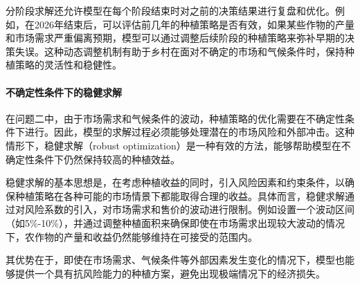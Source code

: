 \documentclass[12pt,a4paper]{nmmcm}
\begin{document}
分阶段求解还允许模型在每个阶段结束时对之前的决策结果进行复盘和优化。例如，在2026年结束后，可以评估前几年的种植策略是否有效，如果某些作物的产量和市场需求严重偏离预期，模型可以通过调整后续阶段的种植策略来弥补早期的决策失误。这种动态调整机制有助于乡村在面对不确定的市场和气候条件时，保持种植策略的灵活性和稳健性。

\paragraph{不确定性条件下的稳健求解}

在问题二中，由于市场需求和气候条件的波动，种植策略的优化需要在不确定性条件下进行。因此，模型的求解过程必须能够处理潜在的市场风险和外部冲击。这种情形下，稳健求解（robust optimization）是一种有效的方法，能够帮助模型在不确定性条件下仍然保持较高的种植效益。

稳健求解的基本思想是，在考虑种植收益的同时，引入风险因素和约束条件，以确保种植策略在各种可能的市场情景下都能取得合理的收益。具体而言，稳健求解通过对风险系数的引入，对市场需求和售价的波动进行限制。例如设置一个波动区间（如5\%-10\%），并通过调整种植面积来确保即使在市场需求出现较大波动的情况下，农作物的产量和收益仍然能够维持在可接受的范围内。

    
    
其优势在于，即使在市场需求、气候条件等外部因素发生变化的情况下，模型也能够提供一个具有抗风险能力的种植方案，避免出现极端情况下的经济损失。
\end{document}
